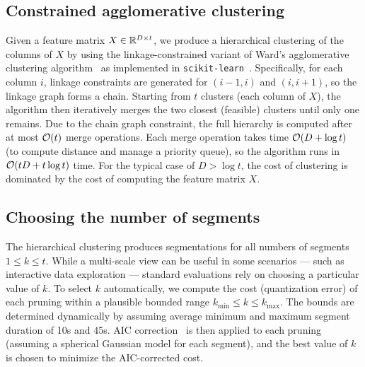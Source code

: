 \documentclass{article}
\begin{document}
\subsection{Constrained agglomerative clustering}
\label{sec:clustering}
Given a feature matrix $X \in \mathbb{R}^{D\times t}$, we produce a hierarchical clustering of the columns of $X$ by using the
linkage-constrained variant of Ward's agglomerative clustering algorithm~\cite{ward1963hierarchical} as implemented in
\texttt{scikit-learn}~\cite{pedregosa2011scikit}.  Specifically, for each column $i$, linkage constraints are generated
for $(i-1, i)$ and $(i, i+1)$, so the linkage graph forms a chain.  Starting from $t$ clusters (each column of $X$), the 
algorithm then iteratively merges the two closest (feasible) clusters until only one remains.
Due to the chain graph constraint, the full hierarchy is computed after at most $\mathcal{O}(t)$ merge operations. Each merge operation
takes time $\mathcal{O}(D + \log t)$ (to compute distance and manage a priority queue), so the algorithm runs in $\mathcal{O}(tD + t\log t)$ time.
For the typical case of $D > \log t$, the cost of clustering is dominated by the cost of computing the feature matrix $X$.

\subsection{Choosing the number of segments}
The hierarchical clustering produces segmentations for all numbers of segments $1 \leq k \leq t$.  While a multi-scale view can 
be useful in some scenarios --- such as interactive data exploration --- standard evaluations rely on choosing a particular value 
of $k$. To select $k$ automatically, we compute the cost (quantization error) of each pruning within a plausible bounded range 
$k_{\min} \leq k \leq k_{\max}$.  The bounds are determined dynamically by assuming average minimum and maximum segment duration 
of 10s and 45s.  AIC correction~\cite{akaike1973information} is then applied to each pruning (assuming a spherical Gaussian
model for each segment), and the best value of $k$ is chosen to minimize the AIC-corrected cost.
\end{document}
